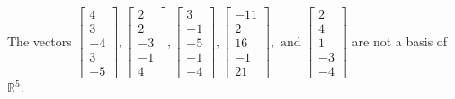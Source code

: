 \begin{exercise}
\begin{exerciseStatement}
  \end{exerciseStatement}
  \begin{exerciseAnswer}
   The vectors \(\left[\begin{array}{r}
4 \\
3 \\
-4 \\
3 \\
-5
\end{array}\right] , \left[\begin{array}{r}
2 \\
2 \\
-3 \\
-1 \\
4
\end{array}\right] , \left[\begin{array}{r}
3 \\
-1 \\
-5 \\
-1 \\
-4
\end{array}\right] , \left[\begin{array}{r}
-11 \\
2 \\
16 \\
-1 \\
21
\end{array}\right] , \text{ and } \left[\begin{array}{r}
2 \\
4 \\
1 \\
-3 \\
-4
\end{array}\right]\) 
  	 are not  a basis of \(\mathbb{R}^5\).
  


  \end{exerciseAnswer}
\end{exercise}